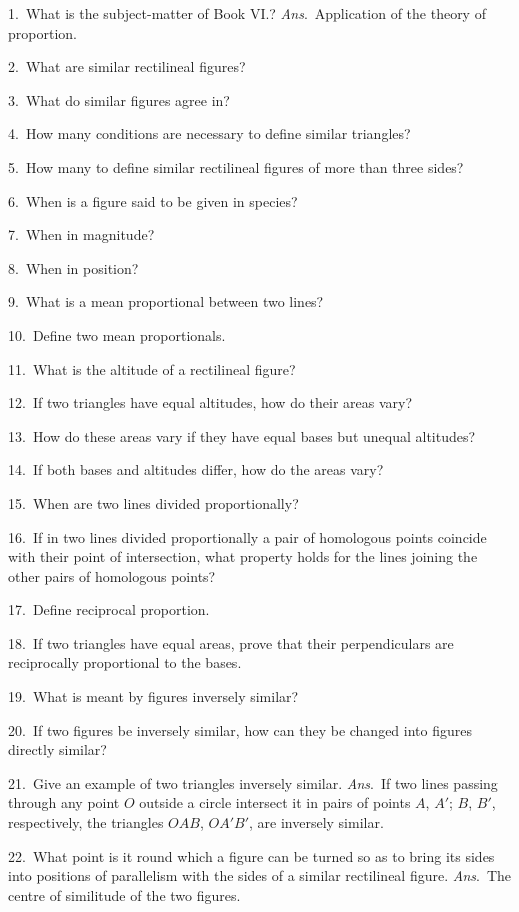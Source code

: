 \documentclass[oneside]{book}
\begin{document}
\begin{footnotesize}
1.~What is the subject-matter of Book VI\@.? \textit{Ans}.\ Application
of the theory of proportion.

2.~What are similar rectilineal figures?

3.~What do similar figures agree in?

4.~How many conditions are necessary to define similar triangles?

5.~How many to define similar rectilineal figures of more
than three sides?

6.~When is a figure said to be given in species?

7.~When in magnitude?

8.~When in position?

9.~What is a mean proportional between two lines?

10.~Define two mean proportionals.

11.~What is the altitude of a rectilineal figure?

12.~If two triangles have equal altitudes, how do their areas
vary?

13.~How do these areas vary if they have equal bases but unequal altitudes?


14.~If both bases and altitudes differ, how do the areas vary?

15.~When are two lines divided proportionally?

16.~If in two lines divided proportionally a pair of homologous
points coincide with their point of intersection, what property
holds for the lines joining the other pairs of homologous
points?

17.~Define reciprocal proportion.

18.~If two triangles have equal areas, prove that their perpendiculars
are reciprocally proportional to the bases.

19.~What is meant by figures inversely similar?

20.~If two figures be inversely similar, how can they be
changed into figures directly similar?

21.~Give an example of two triangles inversely similar. \textit{Ans}.\
If two lines passing through any point $O$ outside a circle intersect
it in pairs of points $A$, $A'$; $B$, $B'$, respectively, the triangles
$OAB$, $OA'B'$, are inversely similar.

22.~What point is it round which a figure can be turned so as
to bring its sides into positions of parallelism with the sides of a
similar rectilineal figure. \textit{Ans}.\ The centre of similitude of the
two figures.


\end{footnotesize}
\end{document}
